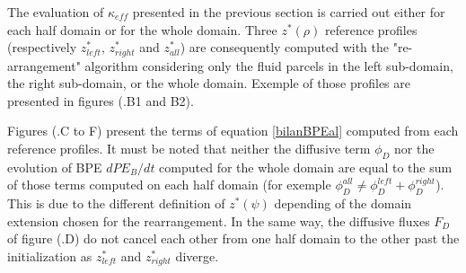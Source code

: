 The evaluation of $\kappa_{eff}$ presented in the previous section is carried out either for each half domain or for the whole domain. Three $z^*(\rho)$ reference profiles (respectively $z^*_{left}$, $z^*_{right}$ and $z^*_{all}$) are consequently computed with the "re-arrangement" algorithm considering only the fluid parcels in the left sub-domain, the right sub-domain, or the whole domain. Exemple of those profiles are presented in figures (.B1 and B2).

Figures (.C to F) present the terms of equation \ref{bilanBPEal} computed from each reference profiles. It must be noted that neither the diffusive term $\phi_D$ nor the evolution of BPE $dPE_B/dt$ computed for the whole domain are equal to the sum of those terms computed on each half domain (for exemple $\phi_D^{all} \ne \phi_D^{left}+\phi_D^{right}$). This is due to the different definition of $z^*(\psi)$ depending of the domain extension chosen for the rearrangement. In the same way, the diffusive fluxes $F_D$ of figure (.D) do not cancel each other from one half domain to the other past the initialization as $z^*_{left}$ and $z^*_{right}$ diverge.

